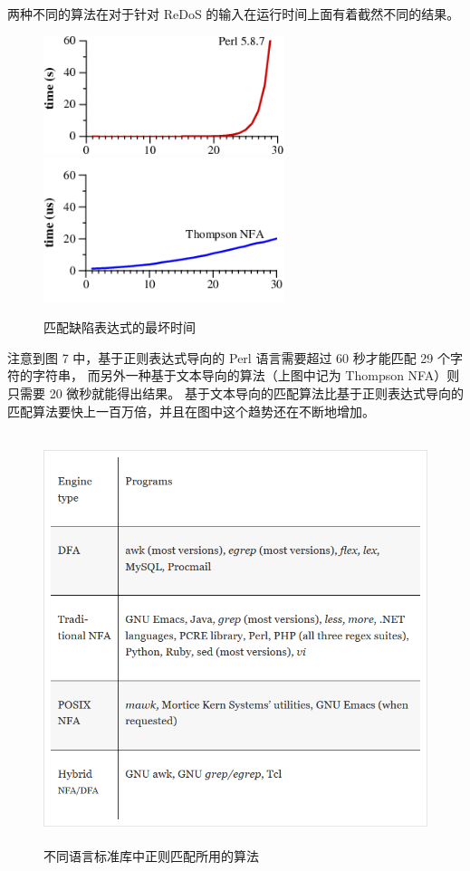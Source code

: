 \documentclass[hyperref,UTF8,12pt,a4paper]{ctexart}
\begin{document}
两种不同的算法在对于针对 ReDoS 的输入在运行时间上面有着截然不同的结果。

\begin{figure}[h]
	\centering
	\includegraphics[width=7cm]{figures/perl.png}
	\includegraphics[width=7cm]{figures/tho.png}
	\caption{匹配缺陷表达式的最坏时间}
\end{figure}

注意到图 7 中，基于正则表达式导向的 Perl 语言需要超过 60 秒才能匹配 29 个字符的字符串，
而另外一种基于文本导向的算法（上图中记为 Thompson NFA）则只需要 20 微秒就能得出结果。
基于文本导向的匹配算法比基于正则表达式导向的匹配算法要快上一百万倍，并且在图中这个趋势还在不断地增加。

\begin{figure}[h]
	\centering
	\includegraphics[height=12cm]{figures/languages.png}
	\caption{不同语言标准库中正则匹配所用的算法}
\end{figure}
\end{document}
